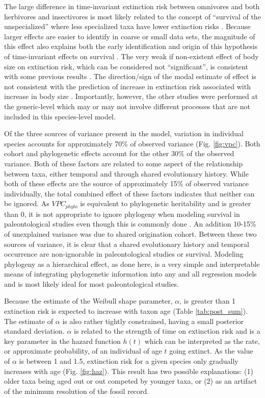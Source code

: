 \documentclass{nature}
\begin{document}
The large difference in time-invariant extinction risk between omnivores and both herbivores and insectivores is most likely related to the concept of ``survival of the unspecialized'' where less specialized taxa have lower extinction risks \cite{Liow2004a,Simpson1944}. Because larger effects are easier to identify in coarse or small data sets, the magnitude of this effect also explains both the early identification and origin of this hypothesis of time-invariant effects on survival \cite{Simpson1944}. The very weak if non-existent effect of body size on extinction risk, which can be considered not ``significant'', is consistent with some previous results \cite{Tomiya2013}. The direction/sign of the modal estimate of effect is not consistent with the prediction of increase in extinction risk associated with increase in body size \cite{Liow2008}. Importantly, however, the other studies were performed at the generic-level which may or may not involve different processes that are not included in this species-level model.

Of the three sources of variance present in the model, variation in individual species accounts for approximately 70\% of observed variance (Fig. \ref{fig:vpc}). Both cohort and phylogenetic effects account for the other 30\% of the observed variance. Both of these factors are related to some aspect of the relationship between taxa, either temporal and through shared evolutionary history. While both of these effects are the source of approximately 15\% of observed variance individually, the total combined effect of these factors indicates that neither can be ignored. As \(VPC_{phylo}\) is equivalent to phylogenetic heritability and is greater than 0, it is not appropriate to ignore phylogeny when modeling survival in paleontological studies \cite{Housworth2004} even though this is commonly done \cite{Alroy2009,Foote2013,Jablonski2006a,Hunt2007a,Liow2008,Payne2007}. An addition 10-15\% of unexplained variance was due to shared origination cohort. Between these two sources of variance, it is clear that a shared evolutionary history and temporal occurrence are non-ignorable in paleontological studies or survival. Modeling phylogeny as a hierarchical effect, as done here, is a very simple and interpretable means of integrating phylogenetic information into any and all regression models \cite{Lynch1991,Housworth2004} and is most likely ideal for most paleontological studies.

Because the estimate of the Weibull shape parameter, \(\alpha\), is greater than 1 extinction risk is expected to increase with taxon age (Table \ref{tab:post_sum}). The estimate of \(\alpha\) is also rather tightly constrained, having a small posterior standard deviation. \(\alpha\) is related to the strength of time on extinction risk and is a key parameter in the hazard function \(h(t)\) which can be interpreted as the rate, or approximate probability, of an individual of age \(t\) going extinct. As the value of \(\alpha\) is between 1 and 1.5, extinction risk for a given species only gradually increases with age (Fig. \ref{fig:haz}). This result has two possible explanations: (1) older taxa being aged out or out competed by younger taxa, or (2) as an artifact of the minimum resolution of the fossil record.
\end{document}
